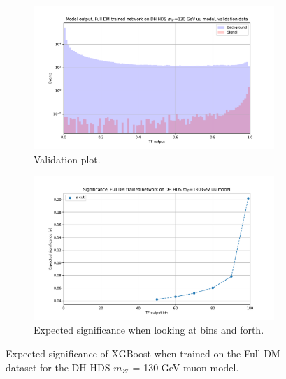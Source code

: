 \documentclass[14pt, a4paper]{book}
\begin{document}
\begin{figure}[!ht]
	\centering
	\begin{subfigure}[b]{0.8\textwidth}
        \centering
        \includegraphics[width=1\textwidth]{XGB_VAL_uu.pdf}
        \caption{Validation plot.}\label{fig:XGB_VAL_UU}
     \end{subfigure}
     \hfill
     \begin{subfigure}[b]{0.8\textwidth}
        \centering
        \includegraphics[width=1\textwidth]{XGB_EXP_SIG_uu.pdf}
        \caption{Expected significance when looking at bins and forth.}\label{fig:XGB_EXP_SIG:uu}
     \end{subfigure}
	\caption{Expected significance of XGBoost when trained on the Full DM dataset for the DH HDS $m_{Z'}$ = 130 GeV muon model.}\label{fig:XGB_SIG_FULL}
\end{figure}
\end{document}
